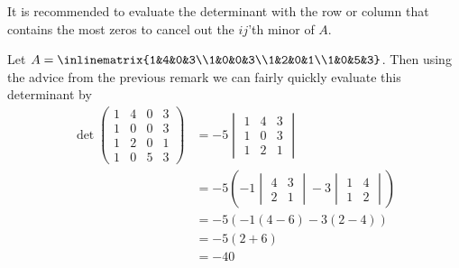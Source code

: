 \begin{rem}
	It is recommended to evaluate the determinant with the row or column that
	contains the most zeros to cancel out the $ij$'th minor of $A$.
\end{rem}

\begin{exm}
	Let $A=\inlinematrix{1&4&0&3\\1&0&0&3\\1&2&0&1\\1&0&5&3}$. Then using the
	advice from the previous remark we can fairly quickly evaluate this determinant by
	\begin{align*}
		\det\begin{pmatrix}
			1 & 4 & \boxed{0} & 3 \\
			1 & 0 & \boxed{0} & 3 \\
			1 & 2 & \boxed{0} & 1 \\
			1 & 0 & \boxed{5} & 3
		\end{pmatrix} & =-5\begin{vmatrix}
			1         & 4         & 3         \\
			\boxed{1} & \boxed{0} & \boxed{3} \\
			1         & 2         & 1
		\end{vmatrix}                                            \\
		                               & =-5\left(-1\begin{vmatrix}
			4 & 3 \\
			2 & 1
		\end{vmatrix}-3\begin{vmatrix}
			1 & 4 \\
			1 & 2
		\end{vmatrix}\right) \\
		                               & =-5\left(-1(4-6)-3(2-4)\right)                                           \\
		                               & =-5(2+6)                                                                 \\
		                               & =-40
	\end{align*}
\end{exm}

